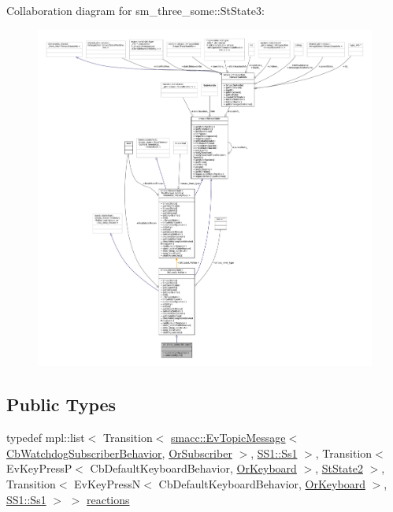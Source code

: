 Collaboration diagram for sm\+\_\+three\+\_\+some\+:\+:St\+State3\+:
\nopagebreak
\begin{figure}[H]
\begin{center}
\leavevmode
\includegraphics[width=350pt]{structsm__three__some_1_1StState3__coll__graph}
\end{center}
\end{figure}
\subsection*{Public Types}
\begin{DoxyCompactItemize}
\item 
typedef mpl\+::list$<$ Transition$<$ \hyperlink{structsmacc_1_1default__events_1_1EvTopicMessage}{smacc\+::\+Ev\+Topic\+Message}$<$ \hyperlink{classsm__three__some_1_1cl__subscriber_1_1CbWatchdogSubscriberBehavior}{Cb\+Watchdog\+Subscriber\+Behavior}, \hyperlink{classsm__three__some_1_1OrSubscriber}{Or\+Subscriber} $>$, \hyperlink{structsm__three__some_1_1SS1_1_1Ss1}{S\+S1\+::\+Ss1} $>$, Transition$<$ Ev\+Key\+PressP$<$ Cb\+Default\+Keyboard\+Behavior, \hyperlink{classsm__three__some_1_1OrKeyboard}{Or\+Keyboard} $>$, \hyperlink{structsm__three__some_1_1StState2}{St\+State2} $>$, Transition$<$ Ev\+Key\+PressN$<$ Cb\+Default\+Keyboard\+Behavior, \hyperlink{classsm__three__some_1_1OrKeyboard}{Or\+Keyboard} $>$, \hyperlink{structsm__three__some_1_1SS1_1_1Ss1}{S\+S1\+::\+Ss1} $>$ $>$ \hyperlink{structsm__three__some_1_1StState3_a94ec512640370313e7731ce02aa6dd80}{reactions}
\end{DoxyCompactItemize}
